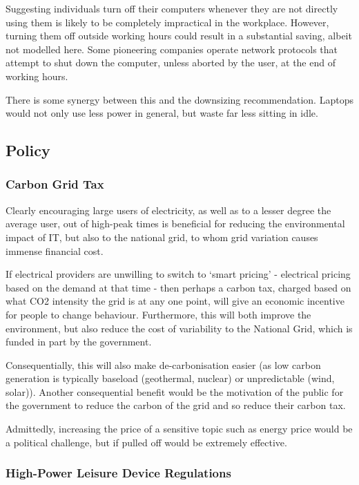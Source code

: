 \documentclass[conference]{IEEEtran}
\begin{document}
Suggesting individuals turn off their computers whenever they are not
directly using them is likely to be completely impractical in the
workplace. However, turning them off outside working hours could
result in a substantial saving, albeit not modelled here. Some
pioneering companies operate network protocols that attempt to shut
down the computer, unless aborted by the user, at the end of working
hours.

There is some synergy between this and the downsizing
recommendation. Laptops would not only use less power in general, but
waste far less sitting in idle.

\subsection{Policy}

\subsubsection{Carbon Grid Tax}

Clearly encouraging large users of electricity, as well as to a lesser
degree the average user, out of high-peak times is beneficial for
reducing the environmental impact of IT, but also to the national
grid, to whom grid variation causes immense financial cost.

If electrical providers are unwilling to switch to ‘smart pricing’ -
electrical pricing based on the demand at that time - then perhaps a
carbon tax, charged based on what CO2 intensity the grid is at any one
point, will give an economic incentive for people to change
behaviour. Furthermore, this will both improve the environment, but
also reduce the cost of variability to the National Grid, which is
funded in part by the government.

Consequentially, this will also make de-carbonisation easier (as low
carbon generation is typically baseload (geothermal, nuclear) or
unpredictable (wind, solar)). Another consequential benefit would be
the motivation of the public for the government to reduce the carbon
of the grid and so reduce their carbon tax.

Admittedly, increasing the price of a sensitive topic such as energy
price would be a political challenge, but if pulled off would be
extremely effective.

\subsubsection{High-Power Leisure Device Regulations}
\end{document}
